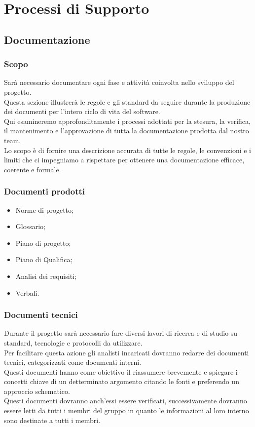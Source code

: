 \section{Processi di Supporto}\label{sup}

\subsection{Documentazione}
\subsubsection{Scopo}
Sarà necessario documentare ogni fase e attività coinvolta nello sviluppo del progetto.\\
Questa sezione illustrerà le regole e gli standard da seguire durante la produzione 
dei documenti per l'intero ciclo di vita del software. \\
Qui esamineremo approfonditamente i processi adottati per la stesura, la verifica\glo, il mantenimento e l’approvazione di tutta la documentazione prodotta dal nostro team. \\
Lo scopo è di fornire una descrizione accurata di tutte le regole, le convenzioni e i limiti che ci impegniamo a rispettare per ottenere una documentazione efficace, coerente e formale.\\

\subsubsection{Documenti prodotti}
\begin{itemize}
    \item Norme di progetto;
    \item Glossario;
    \item Piano di progetto;
    \item Piano di Qualifica;
    \item Analisi dei requisiti;
    \item Verbali.
\end{itemize}

\subsubsection{Documenti tecnici}\label{doctec}
Durante il progetto sarà necessario fare diversi lavori di ricerca e di studio su standard, tecnologie e protocolli da utilizzare.\\
Per facilitare questa azione gli analisti incaricati dovranno redarre dei documenti tecnici, categorizzati come documenti interni.\\
Questi documenti hanno come obiettivo il riassumere brevemente e spiegare i concetti chiave di un detterminato argomento citando le fonti e preferendo un approccio schematico.\\
Questi documenti dovranno anch'essi essere verificati, successivamente dovranno essere letti da tutti i membri del gruppo in quanto le informazioni
al loro interno sono destinate a tutti i membri.

